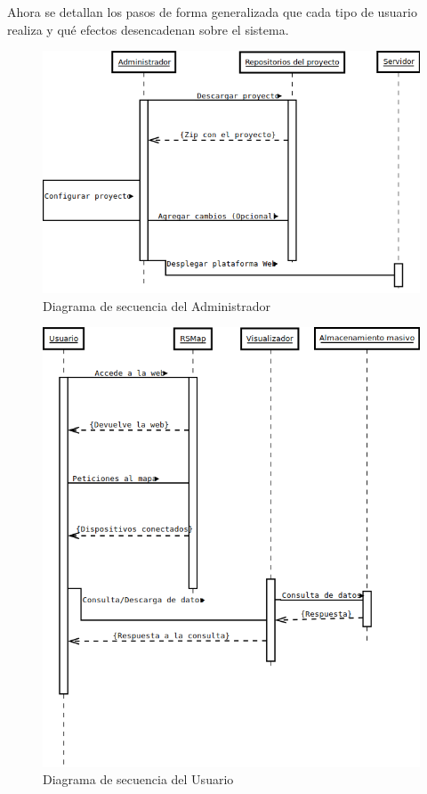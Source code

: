 Ahora se detallan los pasos de forma generalizada que cada tipo de usuario realiza y qué efectos desencadenan sobre el sistema.

\begin{figure}[!h]
  \begin{center}
  \includegraphics[scale=0.45]{../images/diag_plan/seq_admin.png}
  \caption{Diagrama de secuencia del Administrador}
  \label{fig:ar_rsmap}
  \end{center}
\end{figure}

\newpage

\begin{figure}[!h]
  \begin{center}
  \includegraphics[scale=0.5]{../images/diag_plan/seq_user.png}
  \caption{Diagrama de secuencia del Usuario}
  \label{fig:ar_rsmap}
  \end{center}
\end{figure}

